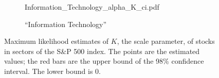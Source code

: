 \documentclass{article}
\newcommand{\1}[1]{
  \mathbf{1}_{\{#1\}}
}
\begin{document}
\begin{figure}[htb!]
\begin{subfigure}[b]{0.45\linewidth}
                    {Information_Technology_alpha_K_ci.pdf}
                    \caption{``Information Technology''}
                    \label{fig:Information_Technology_alpha_K_ci}
  \end{subfigure}
  \caption{\small Maximum likelihood estimates of $K$, the scale
    parameter, of stocks in sectors of the S\&P 500 index. The points
    are the
    estimated values; the red bars are the upper bound of the 98\%
    confidence interval. The lower bound is 0.
  }
\end{figure}




\end{document}
